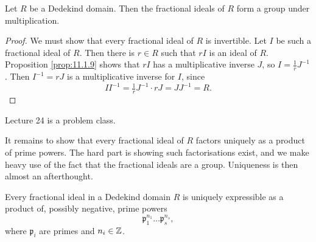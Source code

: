 \begin{theorem}
Let $ R $ be a Dedekind domain. Then the fractional ideals of $ R $ form a group under multiplication.
\end{theorem}

\begin{proof}
We must show that every fractional ideal of $ R $ is invertible. Let $ I $ be such a fractional ideal of $ R $. Then there is $ r \in R $ such that $ rI $ is an ideal of $ R $. Proposition \ref{prop:11.1.9} shows that $ rI $ has a multiplicative inverse $ J $, so $ I = \tfrac{1}{r}J^{-1} $. Then $ I^{-1} = rJ $ is a multiplicative inverse for $ I $, since
$$ II^{-1} = \tfrac{1}{r}J^{-1} \cdot rJ = JJ^{-1} = R. $$
\end{proof}


Lecture 24 is a problem class.


It remains to show that every fractional ideal of $ R $ factors uniquely as a product of prime powers. The hard part is showing such factorisations exist, and we make heavy use of the fact that the fractional ideals are a group. Uniqueness is then almost an afterthought.

\begin{proposition}
Every fractional ideal in a Dedekind domain $ R $ is uniquely expressible as a product of, possibly negative, prime powers
$$ \mathfrak{p}_1^{n_1} \dots \mathfrak{p}_s^{n_s}, $$
where $ \mathfrak{p}_i $ are primes and $ n_i \in \mathbb{Z} $.
\end{proposition}

